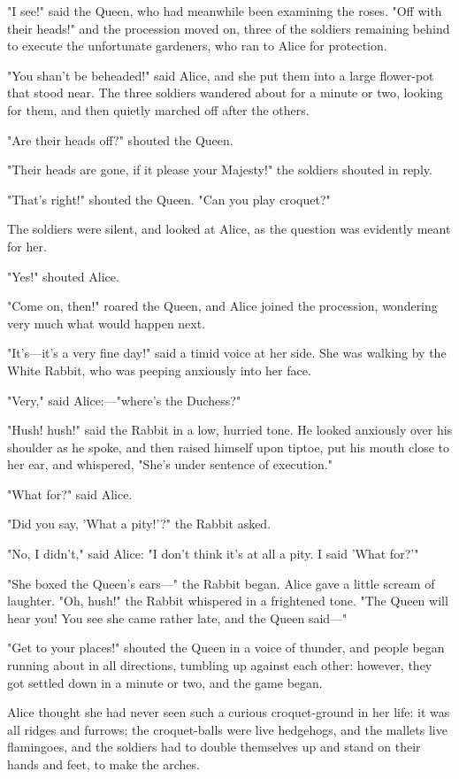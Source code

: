 "I see!" said the Queen, who had meanwhile been examining the roses. "Off with their heads!" and the procession moved on, ​three of the soldiers remaining behind to execute the unfortunate gardeners, who ran to Alice for protection.

"You shan't be beheaded!" said Alice, and she put them into a large flower-pot that stood near. The three soldiers wandered about for a minute or two, looking for them, and then quietly marched off after the others.

"Are their heads off?" shouted the Queen.

"Their heads are gone, if it please your Majesty!" the soldiers shouted in reply.

"That's right!" shouted the Queen. "Can you play croquet?"

The soldiers were silent, and looked at Alice, as the question was evidently meant for her.

"Yes!" shouted Alice.

"Come on, then!" roared the Queen, and Alice joined the procession, wondering very much what would happen next.

"It's—it's a very fine day!" said a timid voice at her side. She was walking by the White Rabbit, who was peeping anxiously into her face.

​"Very," said Alice:—"where's the Duchess?"

"Hush! hush!" said the Rabbit in a low, hurried tone. He looked anxiously over his shoulder as he spoke, and then raised himself upon tiptoe, put his mouth close to her ear, and whispered, "She's under sentence of execution."

"What for?" said Alice.

"Did you say, 'What a pity!'?" the Rabbit asked.

"No, I didn't," said Alice: "I don't think it's at all a pity. I said 'What for?'"

"She boxed the Queen's ears—" the Rabbit began. Alice gave a little scream of laughter. "Oh, hush!" the Rabbit whispered in a frightened tone. "The Queen will hear you! You see she came rather late, and the Queen said—"

"Get to your places!" shouted the Queen in a voice of thunder, and people began running about in all directions, tumbling up against each other: however, they got settled down in a minute or two, and the game began.

​Alice thought she had never seen such a curious croquet-ground in her life: it was all ridges and furrows; the croquet-balls were live hedgehogs, and the mallets live flamingoes, and the soldiers had to double themselves up and stand on their hands and feet, to make the arches.

